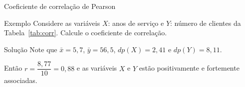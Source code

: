 \documentclass[9pt]{beamer}
\begin{document}
\begin{frame}{Coeficiente de correlação de Pearson}

\begin{block}{Exemplo}
	Considere as variáveis  $X$: anos de serviço e $Y$: número de clientes da Tabela~\ref{tab:corr}. Calcule o coeficiente de correlação.
\end{block}


\begin{block}{Solução}
	Note que $\bar{x}= 5,7$, $\bar{y}=56,5$, $dp(X)=2,41$ e $dp(Y)=8,11$.
	\begin{table}[ht]
		\centering
		
		\caption{Cálculo do coeficiente de correlação linear de Pearson.} 
		\label{tab:corr}
	\end{table}
	Então  $r = \dfrac{8,77}{10} = 0,88$ e as variáveis $X$ e $Y$ estão positivamente e fortemente associadas.
\end{block}
\end{frame}
\end{document}
